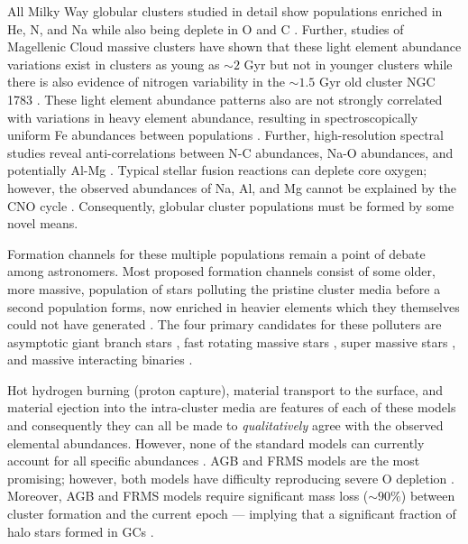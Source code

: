 All Milky Way globular clusters studied in detail show populations enriched in
He, N, and Na while also being deplete in O and C
\citep{Piotto2015,Bastian2018}. Further, studies of Magellenic Cloud
massive clusters have shown that these light element abundance variations exist
in clusters as young as $\sim 2$ Gyr but not in younger clusters
\citep{Martocchia2019} while there is also evidence of nitrogen variability in
the $\sim 1.5$ Gyr old cluster NGC 1783 \citep{Cadelano2022}.  These light
element abundance patterns also are not strongly correlated with variations in
heavy element abundance, resulting in spectroscopically uniform Fe abundances
between populations \citep[though recent work indicates that there may be
iron abundance variations within the first population, e.g.][]{Legnardi2022,
Lardo2022} . Further, high-resolution spectral studies reveal anti-correlations
between N-C abundances, Na-O abundances, and potentially Al-Mg
\citep{Sneden1992, Gratton2012}. Typical stellar fusion reactions can deplete
core oxygen; however, the observed abundances of Na, Al, and Mg cannot be
explained by the CNO cycle \citep{Prantzos2007}. Consequently, globular cluster
populations must be formed by some novel means.

Formation channels for these multiple populations remain a point of debate
among astronomers. Most proposed formation channels consist of some older,
more massive, population of stars polluting the pristine cluster media before a
second population forms, now enriched in heavier elements which they themselves could
not have generated \citep[for a detailed review see ][]{Gratton2012}. The four
primary candidates for these polluters are asymptotic giant branch stars
\citep[AGBs,][]{Ventura2001,DErcole2010}, fast rotating massive stars
\citep[FRMSs,][]{Decressin2007}, super massive stars
\citep[SMSs,][]{Denissenkov2014}, and massive interacting binaries
\citep[MIBs,][]{deMink2009, Bastian2018}. 

Hot hydrogen burning (proton capture), material transport to the surface, and
material ejection into the intra-cluster media are features of each of these
models and consequently they can all be made to {\it qualitatively} agree with
the observed elemental abundances. However, none of the standard models can
currently account for all specific abundances \citep{Gratton2012}. AGB and FRMS
models are the most promising; however, both models have difficulty reproducing
severe O depletion \citep{Ventura2009,Decressin2007}. Moreover, AGB and FRMS
models require significant mass loss ($\sim 90\%$) between cluster formation
and the current epoch --- implying that a significant fraction of halo stars
formed in GCs \citep{Renzini2008,DErcole2008,Bastian2015}.

